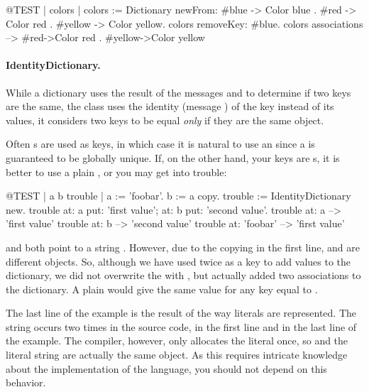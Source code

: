 \documentclass[a4paper,10pt,twoside]{book}
\begin{document}
\begin{code}{@TEST | colors |}
colors := Dictionary newFrom: {#blue -> Color blue . #red -> Color red . #yellow -> Color yellow}.
colors removeKey: #blue.
colors associations --> {#red->Color red . #yellow->Color yellow}
\end{code}

\paragraph{IdentityDictionary.}
While a dictionary uses the result of the messages \ct{=} and  to determine if two keys are the same, the class  uses the identity (message ) of the key instead of its values, \ie it considers two keys to be equal \emph{only} if they are the same object.

Often s are used as keys, in which case it is natural to use an  since a  is guaranteed to be globally unique.
If, on the other hand, your keys are s, it is better to use a plain , or you may get into trouble:

\begin{code}{@TEST | a b trouble |}
a := 'foobar'.
b := a copy.
trouble := IdentityDictionary new.
trouble
    at: a put: 'first value';
    at: b put: 'second value'.
trouble at: a          --> 'first value'
trouble at: b          --> 'second value'
trouble at: 'foobar' --> 'first value'
\end{code}

\noindent
{} and  both point to a string . However, due to the copying in the first line,  and  are different objects. So, although we have used  twice as a key to add values to the dictionary, we did not overwrite the  with , but actually added two associations to the dictionary.
A plain  would give the same value for any key equal to .

The last line of the example is the result of the way literals are represented. The string  occurs two times in the source code, in the first line and in the last line of the example. The compiler, however, only allocates the literal once, so  and the literal string  are actually the same object. As this requires intricate knowledge about the implementation of the language, you should not depend on this behavior.
\end{document}
